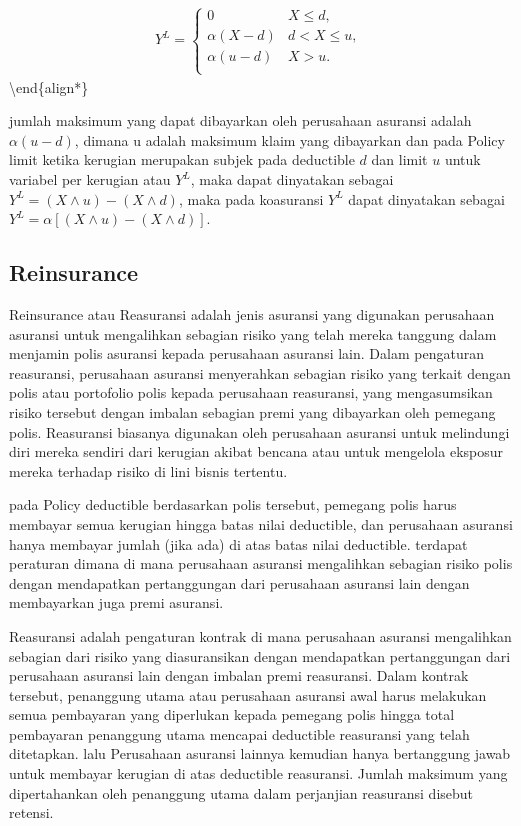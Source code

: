 \documentclass[
]{book}
\begin{document}
\begin{align*}
Y^{L} = \left\{ \begin{matrix}
0 & X \leq d, \\
\alpha\left( X - d \right) & d <  X \leq u, \\
\alpha\left( u - d \right) & X > u. \\
\end{matrix} \right.\
\end{align*}\textbackslash end\{align*\}

jumlah maksimum yang dapat dibayarkan oleh perusahaan asuransi adalah \(\alpha (u-d)\), dimana u adalah maksimum klaim yang dibayarkan dan pada Policy limit ketika kerugian merupakan subjek pada deductible \(d\) dan limit \(u\) untuk variabel per kerugian atau \(Y^L\), maka dapat dinyatakan sebagai \(Y^L=(X\land u)-(X\land d)\), maka pada koasuransi \(Y^L\) dapat dinyatakan sebagai\(Y^L=\alpha[(X\land u)-(X\land d)]\).

\hypertarget{reinsurance}{%
\subsection{Reinsurance}\label{reinsurance}}

Reinsurance atau Reasuransi adalah jenis asuransi yang digunakan perusahaan asuransi untuk mengalihkan sebagian risiko yang telah mereka tanggung dalam menjamin polis asuransi kepada perusahaan asuransi lain. Dalam pengaturan reasuransi, perusahaan asuransi menyerahkan sebagian risiko yang terkait dengan polis atau portofolio polis kepada perusahaan reasuransi, yang mengasumsikan risiko tersebut dengan imbalan sebagian premi yang dibayarkan oleh pemegang polis. Reasuransi biasanya digunakan oleh perusahaan asuransi untuk melindungi diri mereka sendiri dari kerugian akibat bencana atau untuk mengelola eksposur mereka terhadap risiko di lini bisnis tertentu.

pada Policy deductible berdasarkan polis tersebut, pemegang polis harus membayar semua kerugian hingga batas nilai deductible, dan perusahaan asuransi hanya membayar jumlah (jika ada) di atas batas nilai deductible. terdapat peraturan dimana di mana perusahaan asuransi mengalihkan sebagian risiko polis dengan mendapatkan pertanggungan dari perusahaan asuransi lain dengan membayarkan juga premi asuransi.

Reasuransi adalah pengaturan kontrak di mana perusahaan asuransi mengalihkan sebagian dari risiko yang diasuransikan dengan mendapatkan pertanggungan dari perusahaan asuransi lain dengan imbalan premi reasuransi. Dalam kontrak tersebut, penanggung utama atau perusahaan asuransi awal harus melakukan semua pembayaran yang diperlukan kepada pemegang polis hingga total pembayaran penanggung utama mencapai deductible reasuransi yang telah ditetapkan. lalu Perusahaan asuransi lainnya kemudian hanya bertanggung jawab untuk membayar kerugian di atas deductible reasuransi. Jumlah maksimum yang dipertahankan oleh penanggung utama dalam perjanjian reasuransi disebut retensi.
\end{document}
